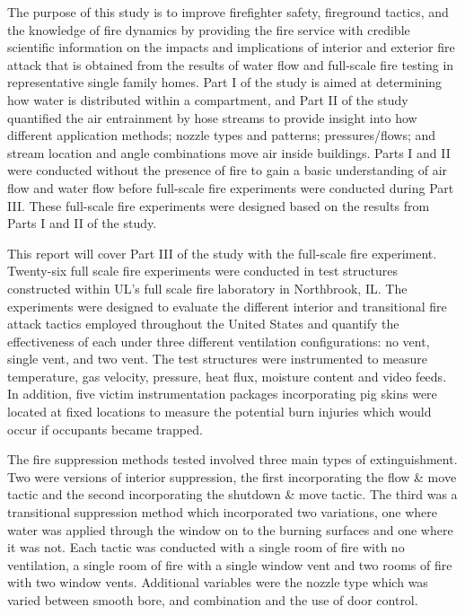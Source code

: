 \documentclass[12pt,oneside]{book}
\begin{document}
The purpose of this study is to improve firefighter safety, fireground tactics, and the knowledge of fire dynamics by providing the fire service with credible scientific information on the impacts and implications of interior and exterior fire attack that is obtained from the results of water flow and full-scale fire testing in representative single family homes. Part I of the study is aimed at determining how water is distributed within a compartment, and Part II of the study quantified the air entrainment by hose streams to provide insight into how different application methods; nozzle types and patterns; pressures/flows; and stream location and angle combinations move air inside buildings. Parts I and II were conducted without the presence of fire to gain a basic understanding of air flow and water flow before full-scale fire experiments were conducted during Part III. These full-scale fire experiments were designed based on the results from Parts I and II of the study. 

This report will cover Part III of the study with the full-scale fire experiment. Twenty-six full scale fire experiments were conducted in test structures constructed within UL's full scale fire laboratory in Northbrook, IL. The experiments were designed to evaluate the different interior and transitional fire attack tactics employed throughout the United States and quantify the effectiveness of each under three different ventilation configurations: no vent, single vent, and two vent. The test structures were instrumented to measure temperature, gas velocity, pressure, heat flux, moisture content and video feeds. In addition, five victim instrumentation packages incorporating pig skins were located at fixed locations to measure the potential burn injuries which would occur if occupants became trapped. 

The fire suppression methods tested involved three main types of extinguishment. Two were versions of interior suppression, the first incorporating the flow \& move tactic and the second incorporating the shutdown \& move tactic. The third was a transitional suppression method which incorporated two variations, one where water was applied through the window on to the burning surfaces and one where it was not. Each tactic was conducted with a single room of fire with no ventilation, a single room of fire with a single window vent and two rooms of fire with two window vents. Additional variables were the nozzle type which was varied between smooth bore, and combination and the use of door control.
\end{document}
